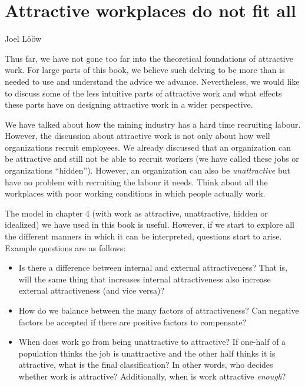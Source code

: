 \documentclass[
  12pt,
]{scrbook}
\newenvironment{chap-auth}
{\vspace{1cm}\begin{center}\begin{flushright}\sffamily\noindent}
  {\end{flushright}\end{center}\vspace{1cm}}
\begin{document}
\hypertarget{attractive-workplaces-do-not-fit-all}{%
\chapter{Attractive workplaces do not fit all}\label{attractive-workplaces-do-not-fit-all}}

\begin{chap-auth}
Joel Lööw
\end{chap-auth}

Thus far, we have not gone too far into the theoretical foundations of attractive work. For large parts of this book, we believe such delving to be more than is needed to use and understand the advice we advance. Nevertheless, we would like to discuss some of the less intuitive parts of attractive work and what effects these parts have on designing attractive work in a wider perspective.

We have talked about how the mining industry has a hard time recruiting labour. However, the discussion about attractive work is not only about how well organizations recruit employees. We already discussed that an organization can be attractive and still not be able to recruit workers (we have called these jobs or organizations ``hidden''). However, an organization can also be \emph{unattractive} but have no problem with recruiting the labour it needs. Think about all the workplaces with poor working conditions in which people actually work.

The model in chapter 4 (with work as attractive, unattractive, hidden or idealized) we have used in this book is useful. However, if we start to explore all the different manners in which it can be interpreted, questions start to arise. Example questions are as follows:

\begin{itemize}
\item
  Is there a difference between internal and external attractiveness? That is, will the same thing that increases internal attractiveness also increase external attractiveness (and vice versa)?
\item
  How do we balance between the many factors of attractiveness? Can negative factors be accepted if there are positive factors to compensate?
\item
  When does work go from being unattractive to attractive? If one-half of a population thinks the job is unattractive and the other half thinks it is attractive, what is the final classification? In other words, who decides whether work is attractive? Additionally, when is work attractive \emph{enough}?
\end{itemize}
\end{document}
